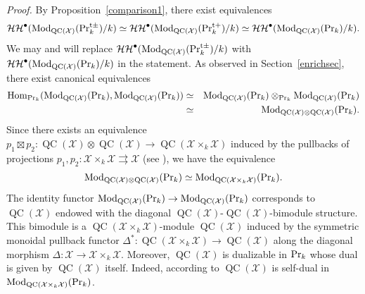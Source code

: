 \documentclass[leqno,12pt]{amsart}
\theoremstyle{plain}
\theoremstyle{definition}
\newcommand{\HH}{\operatorname{\mathcal{HH}}}
\newcommand{\PR}{\textup{Pr}}
\newcommand{\PRTT}{\textup{Pr}^{\textup{t}+}}
\newcommand{\PRTTT}{\textup{Pr}^{\textup{t}\pm}}
\newcommand{\Hom}{\operatorname{Hom}}
\newcommand{\Mod}{\operatorname{Mod}}
\newcommand{\QC}{\operatorname{QC}}
\newcommand{\XX}{\mathcal{X}}
\newcommand{\Proof}{{\sl Proof.}\quad}
\begin{document}
\Proof
By Proposition~\ref{comparison1},
there exist equivalences 
\[
\HH^\bullet(\Mod_{\QC(\mathcal{X})}(\PRTTT_k)/k)\simeq\HH^\bullet(\Mod_{\QC(\mathcal{X})}(\PRTT_k)/k)\simeq \HH^\bullet(\Mod_{\QC(\mathcal{X})}(\PR_k)/k).
\]
We may and will replace $\HH^\bullet(\Mod_{\QC(\mathcal{X})}(\PRTTT_k)/k)$ with $\HH^\bullet(\Mod_{\QC(\mathcal{X})}(\PR_k)/k)$ in the statement.
As observed in Section~\ref{enrichsec},
there exist canonical equivalences
\begin{eqnarray*}
\Hom_{\PR_k}(\Mod_{\QC(\mathcal{X})}(\PR_k),\Mod_{\QC(\mathcal{X})}(\PR_k)) &\simeq& \Mod_{\QC(\mathcal{X})}(\PR_k)\otimes_{\PR_k}\Mod_{\QC(\mathcal{X})}(\PR_k)  \\
&\simeq& \Mod_{\QC(\mathcal{X})\otimes \QC(\mathcal{X})}(\PR_k).
\end{eqnarray*}
Since there exists an equivalence $p_1\boxtimes p_2:\QC(\mathcal{X})\otimes \QC(\mathcal{X})\to \QC(\mathcal{X}\times_k \mathcal{X})$ induced by the pullbacks of projections
$p_1,p_2:\mathcal{X}\times_k \mathcal{X}\rightrightarrows \mathcal{X}$ (see \cite[Theorem 4.7]{BFN}), we have the equivalence
\[
\Mod_{\QC(\mathcal{X})\otimes \QC(\mathcal{X})}(\PR_k)\simeq \Mod_{\QC(\mathcal{X}\times_k\mathcal{X})}(\PR_k).
\]
The identity functor $\Mod_{\QC(\mathcal{X})}(\PR_k)\to \Mod_{\QC(\mathcal{X})}(\PR_k)$ corresponds to
$\QC(\mathcal{X})$ endowed with the diagonal $\QC(\mathcal{X})$-$\QC(\mathcal{X})$-bimodule structure.
This bimodule is a $\QC(\mathcal{X}\times_k\mathcal{X})$-module $\QC(\mathcal{X})$ induced by the symmetric monoidal pullback functor
$\Delta^*:\QC(\mathcal{X}\times_k\mathcal{X})\to \QC(\mathcal{X})$
along the diagonal morphism $\Delta:\mathcal{X}\to \mathcal{X}\times_k\mathcal{X}$.
Moreover, $\QC(\mathcal{X})$ is dualizable in $\PR_k$ whose dual is given by $\QC(\mathcal{X})$ itself.
Indeed, according to \cite[Corollary 4.8]{BFN} $\QC(\XX)$ is self-dual in $\Mod_{\QC(\XX\times_k\XX)}(\PR_k)$. 
\end{document}
